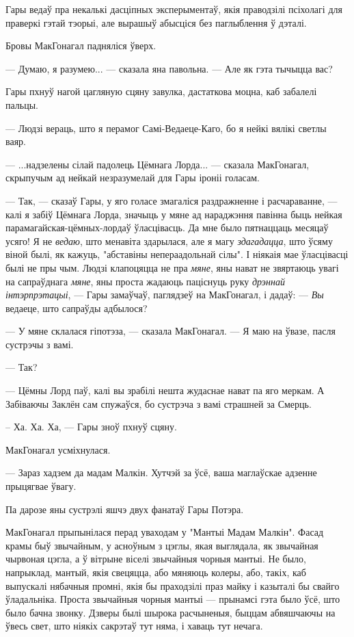 Гары ведаў пра некалькі дасціпных эксперыментаў, якія праводзілі псіхолагі для праверкі гэтай
тэорыі, але вырашыў абысціся без паглыблення ў дэталі.

Бровы МакГонагал падняліся ўверх. 

--- Думаю, я разумею... --- сказала яна павольна. --- Але як гэта тычыцца вас?

Гары пхнуў нагой цагляную сцяну завулка, дастаткова моцна, каб забалелі пальцы.

--- Людзі вераць, што я перамог Самі-Ведаеце-Каго, бо я нейкі вялікі светлы ваяр. 

--- ...надзелены сілай падолець Цёмнага Лорда... --- сказала МакГонагал, скрыпучым ад 
нейкай незразумелай для Гары іроніі голасам.

--- Так, --- сказаў Гары, у яго голасе змагаліся раздражненне і расчараванне, ---
калі я забіў Цёмнага Лорда, значыць у мяне ад нараджэння павінна быць нейкая 
парамагайская-цёмных-лордаў ўласцівасць. Да мне было пятнаццаць месяцаў усяго!
Я не \emph{ведаю}, што менавіта здарылася, але я магу \emph{здагадацца}, што ўсяму
віной былі, як кажуць, "абставіны непераадольнай сілы". І ніякаія мае ўласцівасці 
былі не пры чым. Людзі клапоцяцца не пра \emph{мяне}, яны нават не звяртаюць увагі на
сапраўднага \emph{мяне}, яны проста жадаюць паціснуць руку \emph{дрэннай інтэрпрэтацыі}, ---
Гары замаўчаў, паглядзеў на МакГонагал, і дадаў: --- \emph{Вы} ведаеце, што сапраўды адбылося?

--- У мяне склалася гіпотэза, --- сказала МакГонагал. --- Я маю на ўвазе, пасля сустрэчы з вамі.

--- Так?

--- Цёмны Лорд паў, калі вы зрабілі нешта жудаснае нават па яго меркам. А Забіваючы Заклён
сам спужаўся, бо сустрэча з вамі страшней за Смерць.

-- Ха. Ха. Ха, --- Гары зноў пхнуў сцяну.

МакГонагал усміхнулася.

--- Зараз хадзем да мадам Малкін. Хутчэй за ўсё, ваша маглаўскае адзенне прыцягвае ўвагу.

Па дарозе яны сустрэлі яшчэ двух фанатаў Гары Потэра.

МакГонагал прыпынілася перад уваходам у "Мантыі Мадам Малкін". Фасад крамы быў звычайным, у асноўным
з цэглы, якая выглядала, як звычайная чырвоная цэгла, а ў вітрыне віселі звычайныя чорныя 
мантыі. Не было, напрыклад, мантый, якія свецяцца, або мяняюць колеры, або, такіх, каб
выпускалі нябачныя промні, якія бы праходзілі праз майку і казыталі бы свайго ўладальніка. Проста 
звычайныя чорныя мантыі --- прынамсі гэта было ўсё, што было бачна звонку. Дзверы былі 
шырока расчыненыя, быццам абвяшчаючы на ўвесь свет, што ніякіх сакрэтаў тут няма, і хаваць
тут нечага.

